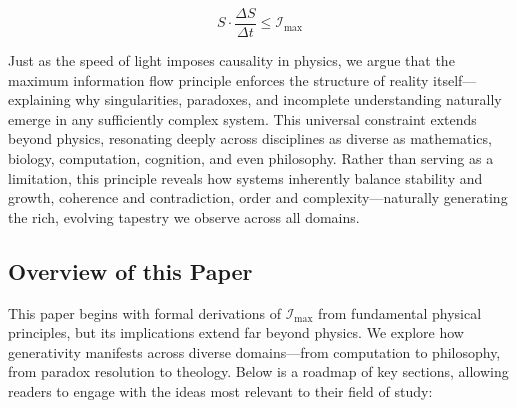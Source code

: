 \documentclass[12pt]{article}
\begin{document}
\begin{equation}
    S \cdot \frac{\Delta S}{\Delta t} \leq \mathcal{I}_{\text{max}}
\end{equation}

Just as the speed of light imposes causality in physics, we argue that the maximum information flow principle enforces the structure of reality itself—explaining why singularities, paradoxes, and incomplete understanding naturally emerge in any sufficiently complex system. This universal constraint extends beyond physics, resonating deeply across disciplines as diverse as mathematics, biology, computation, cognition, and even philosophy. Rather than serving as a limitation, this principle reveals how systems inherently balance stability and growth, coherence and contradiction, order and complexity—naturally generating the rich, evolving tapestry we observe across all domains.

\subsection{Overview of this Paper}

This paper begins with formal derivations of $\mathcal{I}_{\text{max}}$ from fundamental physical principles, but its implications extend far beyond physics. We explore how generativity manifests across diverse domains—from computation to philosophy, from paradox resolution to theology. Below is a roadmap of key sections, allowing readers to engage with the ideas most relevant to their field of study:
\end{document}
